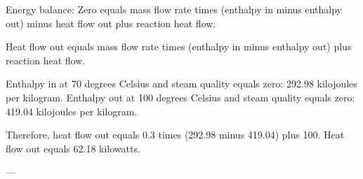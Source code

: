 Energy balance:  
Zero equals mass flow rate times (enthalpy in minus enthalpy out) minus heat flow out plus reaction heat flow.  

Heat flow out equals mass flow rate times (enthalpy in minus enthalpy out) plus reaction heat flow.  

Enthalpy in at 70 degrees Celsius and steam quality equals zero: 292.98 kilojoules per kilogram.  
Enthalpy out at 100 degrees Celsius and steam quality equals zero: 419.04 kilojoules per kilogram.  

Therefore, heat flow out equals 0.3 times (292.98 minus 419.04) plus 100.  
Heat flow out equals 62.18 kilowatts.  

---